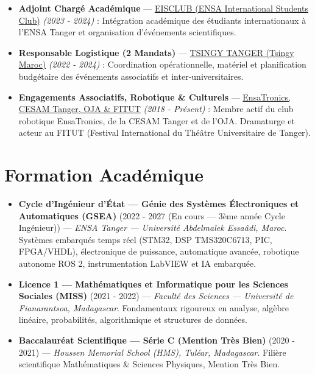 \documentclass[10pt,a4paper]{article}
\begin{document}
\begin{itemize}
\item \textbf{Adjoint Chargé Académique} --- \href{https://www.linkedin.com/company/eisclubuae/home/}{EISCLUB (ENSA International Students Club)} \textit{(2023 - 2024)} : Intégration académique des étudiants internationaux à l'ENSA Tanger et organisation d'événements scientifiques.
\item \textbf{Responsable Logistique (2 Mandats)} --- \href{https://tsingymaroc.org/}{TSINGY TANGER (Tsingy Maroc)} \textit{(2022 - 2024)} : Coordination opérationnelle, matériel et planification budgétaire des événements associatifs et inter-universitaires.
\item \textbf{Engagements Associatifs, Robotique \& Culturels} --- \href{https://cesamcentrale.org/category/sections-cesam/tanger/}{EnsaTronics, CESAM Tanger, OJA \& FITUT} \textit{(2018 - Présent)} : Membre actif du club robotique EnsaTronics, de la CESAM Tanger et de l'OJA. Dramaturge et acteur au FITUT (Festival International du Théâtre Universitaire de Tanger).
\end{itemize}
\section*{Formation Acad\'emique}
\begin{itemize}
\item \textbf{Cycle d'Ingénieur d'État --- Génie des Systèmes Électroniques et Automatiques (GSEA)} (2022 - 2027 (En cours --- 3ème année Cycle Ingénieur)) --- \textit{ENSA Tanger --- Université Abdelmalek Essaâdi, Maroc}. Systèmes embarqués temps réel (STM32, DSP TMS320C6713, PIC, FPGA/VHDL), électronique de puissance, automatique avancée, robotique autonome ROS 2, instrumentation LabVIEW et IA embarquée.
\item \textbf{Licence 1 --- Mathématiques et Informatique pour les Sciences Sociales (MISS)} (2021 - 2022) --- \textit{Faculté des Sciences --- Université de Fianarantsoa, Madagascar}. Fondamentaux rigoureux en analyse, algèbre linéaire, probabilités, algorithmique et structures de données.
\item \textbf{Baccalauréat Scientifique --- Série C (Mention Très Bien)} (2020 - 2021) --- \textit{Houssen Memorial School (HMS), Tuléar, Madagascar}. Filière scientifique Mathématiques \& Sciences Physiques, Mention Très Bien.
\end{itemize}
\end{document}
